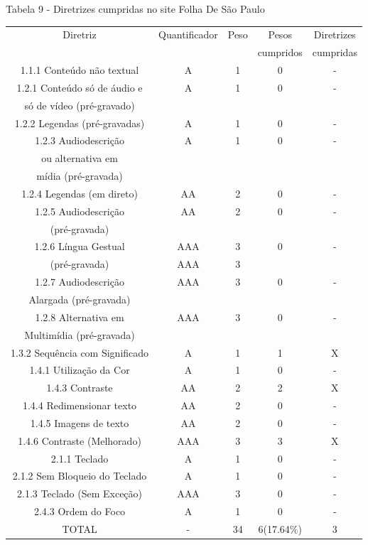 \documentclass[a4paper]{article}
\begin{document}
\begin{titlepage}
Tabela 9 - Diretrizes cumpridas no site Folha De São Paulo\\[-1cm]
\begin{center}
	\fontsize{8pt}{8pt}\selectfont	
	\begin{longtable}{|c|c|c|c|c|}
		\hline
		Diretriz & Quantificador & Peso & Pesos & Diretrizes\\
		& & & cumpridos & cumpridas\\
		\hline
		1.1.1 Conteúdo não textual & A & 1 & 0 & - \\
		\hline
		1.2.1 Conteúdo só de áudio e & A & 1 & 0 & - \\
		só de vídeo (pré-gravado) & & & & \\
		\hline
		1.2.2 Legendas (pré-gravadas) & A & 1 & 0 & - \\
		\hline
		1.2.3 Audiodescrição & A & 1 & 0 & - \\
		ou alternativa em & & & & \\
		mídia (pré-gravada) & & & & \\
		\hline
		1.2.4 Legendas (em direto) & AA & 2 & 0 & - \\
		\hline
		1.2.5 Audiodescrição & AA & 2 & 0 & - \\
		(pré-gravada) & & & & \\
		\hline
		1.2.6 Língua Gestual & AAA & 3 & 0 & - \\
		(pré-gravada) & AAA & 3 & & \\
		\hline
		1.2.7 Audiodescrição & AAA & 3 & 0 & - \\
		Alargada (pré-gravada) & & & & \\
		\hline
		1.2.8 Alternativa em & AAA & 3 & 0 & - \\
		Multimídia (pré-gravada) & & & & \\
		\hline
		1.3.2 Sequência com Significado & A & 1 & 1 & X \\
		\hline
		1.4.1 Utilização da Cor & A & 1 & 0 & - \\
		\hline
		1.4.3 Contraste & AA & 2 & 2 & X \\
		\hline
		1.4.4 Redimensionar texto & AA & 2 & 0 & - \\
		\hline
		1.4.5 Imagens de texto & AA & 2 & 0 & - \\
		\hline
		1.4.6 Contraste (Melhorado) & AAA & 3 & 3 & X \\
		\hline
		2.1.1 Teclado & A & 1 & 0 & - \\
		\hline
		2.1.2 Sem Bloqueio do Teclado & A & 1 & 0 & - \\
		\hline
		2.1.3 Teclado (Sem Exceção) & AAA & 3 & 0 & - \\
		\hline
		2.4.3 Ordem do Foco & A & 1 & 0 & - \\
		\hline
		TOTAL & - & 34 & 6(17.64\%) & 3 \\
		\hline
	\end{longtable}
\end{center}


\end{titlepage}
\end{document}
